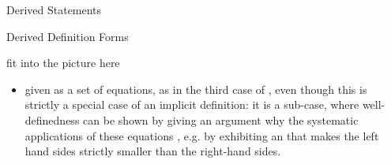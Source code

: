 \begin{omgroup}{Derived Statements}
\begin{module}[id=derived-defs]
\begin{omgroup}[short=Derived Definitions]{Derived Definition Forms}
\begin{oldpart}{fit into the picture here}
\begin{omtext}
\begin{itemize}
  Note that this kind of definitions requires a proof of unique existence to ensure
  {ness}.  Incidentally, if we leave out the part in square
  brackets in the second definition in {}, the differential equation
  only characterizes the exponential function up to additive real constants. In this case,
  the ``definition'' only restricts the meaning of the exponential function to a set of
  possible values.  
\item given as a set of equations, as in the third case of {}, even
  though this is strictly a special case of an implicit definition: it is a sub-case,
  where well-definedness can be shown by giving an argument why the systematic
  applications of these equations , e.g.  by exhibiting
  an {} that makes the left hand sides strictly smaller than the
  right-hand sides. 
\end{itemize}
\end{omtext}


\end{oldpart}
\end{omgroup}
\end{module}
\end{omgroup}

